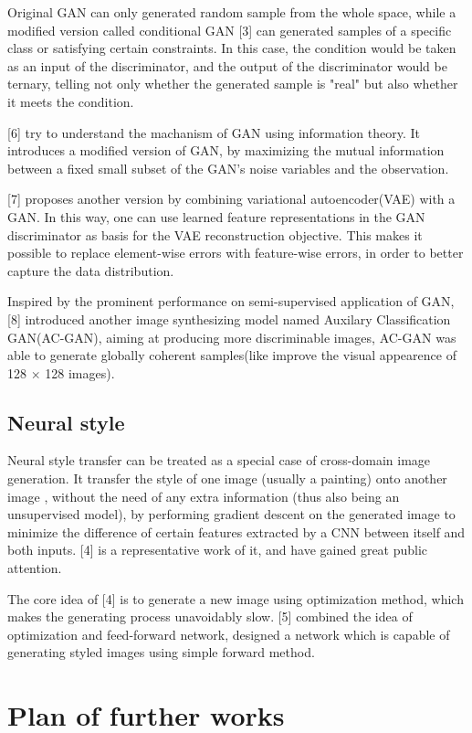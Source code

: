 \documentclass{article}
\begin{document}
Original GAN can only generated random sample from the whole space, while a modified version called conditional GAN [3] can generated samples of a specific class or satisfying certain constraints. In this case, the condition would be taken as an input of the discriminator, and the output of the discriminator would be ternary, telling not only whether the generated sample is "real" but also whether it meets the condition.

[6] try to understand the machanism of GAN using information theory. It introduces a modified version of GAN, by maximizing the mutual information between a fixed small subset of the GAN's noise variables and the observation.

[7] proposes another version by combining variational autoencoder(VAE) with a GAN. In this way, one can use learned feature representations in the GAN discriminator as basis for the VAE reconstruction objective. This makes it possible to replace element-wise errors with feature-wise errors, in order to better capture the data distribution. 

Inspired by the prominent performance on semi-supervised application of GAN, [8] introduced another image synthesizing model named Auxilary Classification GAN(AC-GAN), aiming at producing more discriminable images, AC-GAN was able to generate globally coherent samples(like improve the visual appearence of 128 $\times$ 128 images).

\subsection{Neural style}

Neural style transfer can be treated as a special case of cross-domain image generation. It transfer the style of one image (usually a painting) onto another image , without the need of any extra information (thus also being an unsupervised model), by performing gradient descent on the generated image to minimize the difference of certain features extracted by a CNN between itself and both inputs. [4] is a representative work of it, and have gained great public attention.

The core idea of [4] is to generate a new image using optimization method, which makes the generating process unavoidably slow. [5] combined the idea of optimization and feed-forward network, designed a network which is capable of generating styled images using simple forward method.  

\section{Plan of further works}
\end{document}
